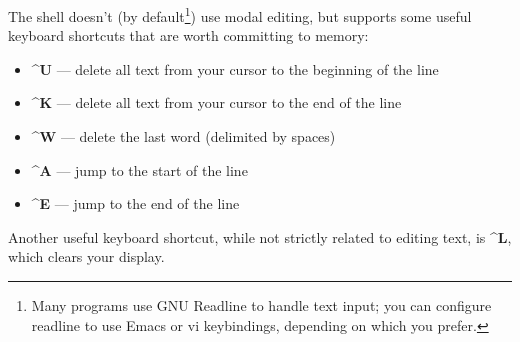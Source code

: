 \documentclass{article}
\begin{document}
The shell doesn't (by default\footnote{Many programs use GNU Readline to handle text input; you can configure readline to use Emacs or vi keybindings, depending on which you prefer.}) use modal editing, but supports some useful keyboard shortcuts that are worth committing to memory:
\begin{itemize}
	\item \textbf{\textasciicircum{}U} --- delete all text from your cursor to the beginning of the line
	\item \textbf{\textasciicircum{}K} --- delete all text from your cursor to the end of the line
	\item \textbf{\textasciicircum{}W} --- delete the last word (delimited by spaces)
	\item \textbf{\textasciicircum{}A} --- jump to the start of the line
	\item \textbf{\textasciicircum{}E} --- jump to the end of the line
\end{itemize}
Another useful keyboard shortcut, while not strictly related to editing text, is \textbf{\textasciicircum{}L}, which clears your display.
\end{document}
